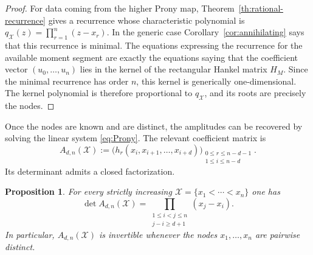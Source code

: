 \documentclass[reqno]{amsart}
\numberwithin{theorem}{section}
\newtheorem{proposition}[theorem]{Proposition}
\newcommand{\cX}{\mathcal{X}}
\begin{document}
\begin{proof}
For data coming from the higher Prony map, Theorem~\ref{th:rational-recurrence} gives a recurrence whose characteristic polynomial is $q_\cX(z)=\prod_{r=1}^n(z-x_r)$. In the generic case Corollary~\ref{cor:annihilating} says that this recurrence is minimal. The equations expressing the recurrence for the available moment segment are exactly the equations saying that the coefficient vector $(u_0,\dots,u_n)$ lies in the kernel of the rectangular Hankel matrix $H_M$. Since the minimal recurrence has order $n$, this kernel is generically one-dimensional. The kernel polynomial is therefore proportional to $q_\cX$, and its roots are precisely the nodes.
\end{proof}

Once the nodes are known and are distinct, the amplitudes can be recovered by solving the linear system \eqref{eq:Prony}. The relevant coefficient matrix is
\[
A_{d,n}(\cX):=\bigl(h_{r}(x_i,x_{i+1},\dots,x_{i+d})\bigr)_{\substack{0\le r\le n-d-1\\ 1\le i\le n-d}}.
\]
Its determinant admits a closed factorization.

\begin{proposition}\label{prop:detA}
For every strictly increasing $\cX=\{x_1<\cdots<x_n\}$ one has
\[
\det A_{d,n}(\cX)
=
\prod_{\substack{1\le i<j\le n\\ j-i\ge d+1}} (x_j-x_i).
\]
In particular, $A_{d,n}(\cX)$ is invertible whenever the nodes $x_1,\dots,x_n$ are pairwise distinct.
\end{proposition}
\end{document}
